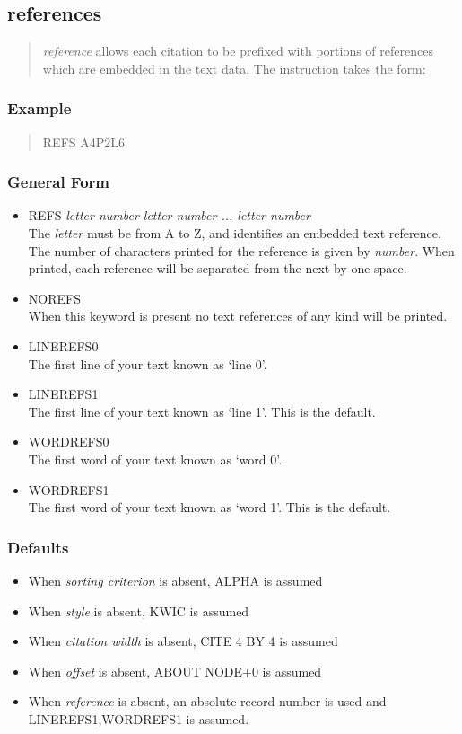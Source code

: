 \subsection{references}
\label{references}
\begin{quote}
{\em reference} allows each citation to be prefixed with portions of references
which are embedded in the text data.  The instruction takes the form:
\end{quote}

\subsubsection{Example}
\begin{quote}
REFS A4P2L6
\end{quote}

\subsubsection{General Form}
\begin{itemize}
\item REFS {\em letter number letter number ... letter number }\\
    The {\em letter} must be from A to Z, and identifies an embedded text
    reference.  The number of characters printed for the reference is given
    by {\em number}.  When printed, each reference will be separated from the
    next by one space.
\item NOREFS\\
   When this keyword is present no text references of any kind will be printed.
\item LINEREFS0\\
   The first line of your text known as `line 0'.
\item LINEREFS1\\
   The first line of your text known as `line 1'. This is the default.
\item WORDREFS0\\
   The first word of your text known as `word 0'.
\item WORDREFS1\\
   The first word of your text known as `word 1'. This is the default.
\end{itemize}

\subsubsection{Defaults}
\begin{itemize}
\item When {\em sorting criterion} is absent, ALPHA is assumed
\item When {\em style} is absent, KWIC is assumed
\item When {\em citation width} is absent, CITE 4 BY 4 is assumed
\item When {\em offset} is absent, ABOUT NODE+0 is assumed
\item When {\em reference} is absent, an absolute record number is used
      and LINEREFS1,WORDREFS1 is assumed.
\end{itemize}

